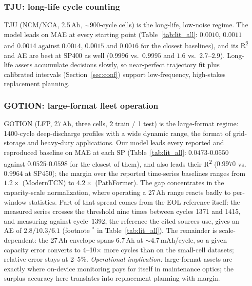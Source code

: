 \subsubsection{TJU: long-life cycle counting}
TJU (NCM/NCA, 2.5\,Ah, $\sim$900-cycle cells) is the long-life,
low-noise regime. The model leads on MAE at every starting point
(Table~\ref{tab:lit_all}: $0.0010$, $0.0011$ and $0.0014$ against
$0.0014$, $0.0015$ and $0.0016$ for the closest baselines), and its
R\textsuperscript{2} and AE are best at SP400 as well ($0.9996$ vs.\
$0.9995$ and $1.6$ vs.\ $2.7$--$2.9$).
Long-life assets accumulate decisions slowly, so near-perfect
trajectory fit plus calibrated intervals (Section~\ref{sec:conf})
support low-frequency, high-stakes replacement planning.





\subsubsection{GOTION: large-format fleet operation}
GOTION (LFP, 27\,Ah, three cells, 2 train / 1 test) is the
large-format regime: 1400-cycle deep-discharge profiles with a wide
dynamic range, the format of grid-storage and heavy-duty
applications. Our
model leads every reported and reproduced baseline on MAE at each SP
(Table~\ref{tab:lit_all}: $0.0473$-$0.0550$ against $0.0525$-$0.0598$
for the closest of them), and also leads their R\textsuperscript{2}
($0.9970$ vs.\ $0.9964$ at SP450); the margin over the reported
time-series baselines ranges from $1.2\times$ (ModernTCN) to
$4.2\times$ (PathFormer). The gap concentrates in the capacity-scale
normalization, where operating a 27\,Ah range reacts badly to
per-window statistics. Part of that spread comes from the EOL reference
itself: the measured series crosses the threshold nine times between cycles
1371 and 1415, and measuring against cycle~1392, the reference the cited
sources use, gives an AE of $2.8/10.3/6.1$ (footnote
$^{\ast}$ in Table~\ref{tab:lit_all}). The remainder is scale-dependent:
the 27\,Ah envelope spans
$6.7$\,Ah at $\sim$4.7\,mAh/cycle, so a given capacity error
converts to 4--10$\times$ more cycles than on the small-cell
datasets; relative error stays at 2--5\%. \emph{Operational
implication:} large-format assets are exactly where on-device
monitoring pays for itself in maintenance optics; the surplus
accuracy here translates into replacement planning with margin.






